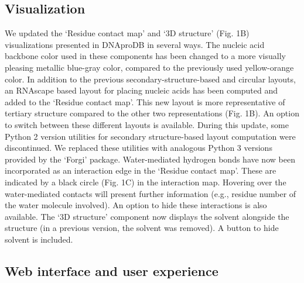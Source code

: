 \subsection{Visualization}
We updated the ‘Residue contact map’ and ‘3D structure’ (Fig. 1B) visualizations presented in DNAproDB in several ways. The nucleic acid backbone color used in these components has been changed to a more visually pleasing metallic blue-gray color, compared to the previously used yellow-orange color. 
In addition to the previous secondary-structure-based and circular layouts, an RNAscape \citep{Mitra2024rnascape} based layout for placing nucleic acids has been computed and added to the ‘Residue contact map’. This new layout is more representative of tertiary structure compared to the other two representations (Fig. 1B). An option to switch between these different layouts is available.
During this update, some Python 2 version utilities for secondary structure-based layout computation were discontinued. We replaced these utilities with analogous Python 3 versions provided by the ‘Forgi’ \citep{Thiel2019} package. 
Water-mediated hydrogen bonds have now been incorporated as an interaction edge in the ‘Residue contact map’. These are indicated by a black circle (Fig. 1C) in the interaction map. Hovering over the water-mediated contacts will present further information (e.g., residue number of the water molecule involved). An option to hide these interactions is also available. The ‘3D structure’ component now displays the solvent alongside the structure (in a previous version, the solvent was removed). A button to hide solvent is included. 

\subsection{Web interface and user experience}

